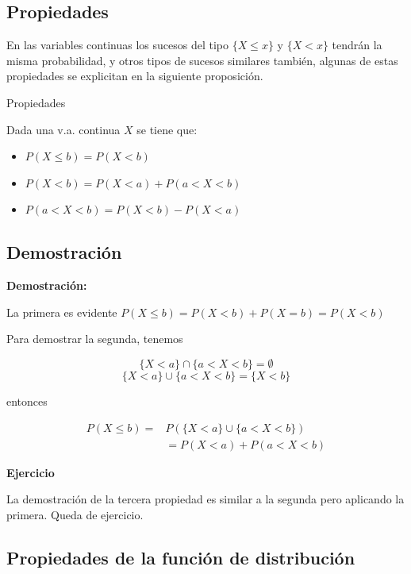 \documentclass[]{book}
\providecommand{\tightlist}{%
  \setlength{\itemsep}{0pt}\setlength{\parskip}{0pt}}
\begin{document}
\hypertarget{propiedades-18}{%
\subsection{Propiedades}\label{propiedades-18}}

En las variables continuas los sucesos del tipo \(\{X\leq x \}\) y \(\{X< x \}\) tendrán la
misma probabilidad, y otros tipos de sucesos similares también, algunas de estas
propiedades se explicitan en la siguiente proposición.

Propiedades

Dada una v.a. continua \(X\) se tiene que:

\begin{itemize}
\tightlist
\item
  \(P(X\leq b)=P(X<b)\)
\item
  \(P(X<b)=P(X<a)+P(a<X<b)\)
\item
  \(P(a<X<b)=P(X<b)-P(X<a)\)
\end{itemize}

\hypertarget{demostraciuxf3n-2}{%
\subsection{Demostración}\label{demostraciuxf3n-2}}

\textbf{Demostración:}

La primera es evidente \(P(X\leq b)=P(X<b)+P(X=b)=P(X<b)\)

Para demostrar la segunda, tenemos

\[\{X<a\}\cap \{a<X<b\}=\emptyset\]
\[\{X<a\}\cup \{a<X<b\}=\{X<b\}\]

entonces

\begin{eqnarray*}
P(X\leq b)= & P(\{X<a\}\cup \{a<X<b\})\\
& = P(X<a)+P(a<X<b)
\end{eqnarray*}

\textbf{Ejercicio}

La demostración de la tercera propiedad es similar a la segunda pero aplicando la primera. Queda de ejercicio.

\hypertarget{propiedades-de-la-funciuxf3n-de-distribuciuxf3n-1}{%
\subsection{Propiedades de la función de distribución}\label{propiedades-de-la-funciuxf3n-de-distribuciuxf3n-1}}
\end{document}
